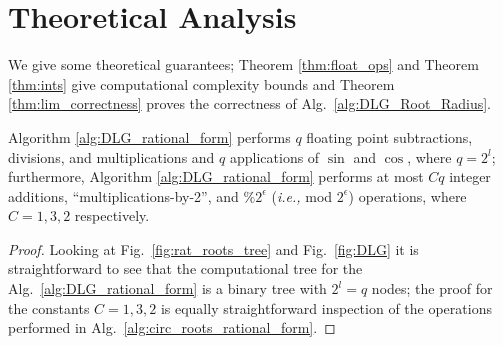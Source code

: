 \documentclass[sigconf]{acmart}
\begin{document}
\section{Theoretical Analysis}\label{sec:the_ana}
We give some theoretical guarantees; Theorem \ref{thm:float_ops} and Theorem \ref{thm:ints} give computational complexity bounds and Theorem \ref{thm:lim_correctness} proves the correctness of Alg.~\ref{alg:DLG_Root_Radius}.
\begin{theorem}\label{thm:float_ops}
Algorithm \ref{alg:DLG_rational_form} performs $q $ floating point subtractions, divisions, and multiplications and $q $ applications of $\sin$ and $\cos$, where $q = 2^l$; furthermore, Algorithm \ref{alg:DLG_rational_form} performs at most $Cq $  integer additions, ``multiplications-by-2'', and $ \%2^\epsilon $ (\emph{i.e.,} mod $ 2^\epsilon $) operations, where $C=1,3,2$ respectively.
\end{theorem}
\begin{proof}
Looking at Fig.~\ref{fig:rat_roots_tree} and Fig.~\ref{fig:DLG} it is straightforward to see that the computational tree for the Alg.~\ref{alg:DLG_rational_form} is a binary tree with $2^l = q$ nodes; the proof for the constants $C=1,3,2$ is equally straightforward inspection of the operations performed in Alg.~\ref{alg:circ_roots_rational_form}.
\end{proof}
\end{document}

